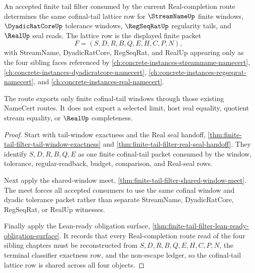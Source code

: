 \begin{theorem}
\label{thm:finite-tail-filter-real-completion-lattice-link}
\label{thm:finitetailfilter-l10-sibling-forward-route}
An accepted finite tail filter consumed by the current Real-completion route determines the same cofinal-tail lattice row for $\StreamNameUp$ finite windows, $\DyadicRatCoreUp$ tolerance windows, $\RegSeqRatUp$ regularity tails, and $\RealUp$ seal reads. The lattice row is the displayed finite packet
$$
F=(S,D,R,B,Q,E,H,C,P,N),
$$
with StreamName, DyadicRatCore, RegSeqRat, and RealUp appearing only as the four sibling faces referenced by \autoref{ch:concrete-instances-streamname-namecert}, \autoref{ch:concrete-instances-dyadicratcore-namecert}, \autoref{ch:concrete-instances-regseqrat-namecert}, and \autoref{ch:concrete-instances-real-namecert}.

The route exports only finite cofinal-tail windows through those existing NameCert routes. It does not export a selected limit, host real equality, quotient stream equality, or $\RealUp$ completeness.
\end{theorem}
\begin{proof}
Start with tail-window exactness and the Real seal handoff, \autoref{thm:finite-tail-filter-tail-window-exactness} and \autoref{thm:finite-tail-filter-real-seal-handoff}. They identify $S,D,R,B,Q,E$ as one finite cofinal-tail packet consumed by the window, tolerance, regular-readback, budget, comparison, and Real-seal rows.

Next apply the shared-window meet, \autoref{thm:finite-tail-filter-shared-window-meet}. The meet forces all accepted consumers to use the same cofinal window and dyadic tolerance packet rather than separate StreamName, DyadicRatCore, RegSeqRat, or RealUp witnesses.

Finally apply the Lean-ready obligation surface, \autoref{thm:finite-tail-filter-lean-ready-obligation-surface}. It records that every Real-completion route read of the four sibling chapters must be reconstructed from $S,D,R,B,Q,E,H,C,P,N$, the terminal classifier exactness row, and the non-escape ledger, so the cofinal-tail lattice row is shared across all four objects.
\end{proof}

